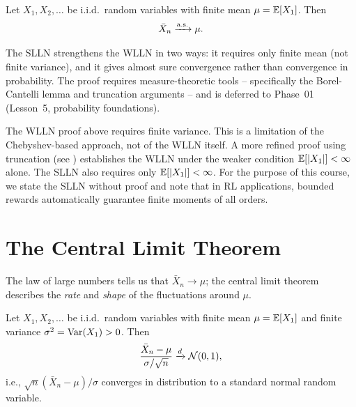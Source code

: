 \documentclass[11pt,a4paper]{article}
\begin{document}
\begin{theorem}
\label{thm:slln}
Let $X_1, X_2, \ldots$ be i.i.d.\ random variables with finite mean
$\mu = \mathbb{E}[X_1]$. Then
\[
    \bar{X}_n \xrightarrow{\text{a.s.}} \mu.
\]
\end{theorem}

The SLLN strengthens the WLLN in two ways: it requires only finite
mean (not finite variance), and it gives almost sure convergence
rather than convergence in probability. The proof requires
measure-theoretic tools -- specifically the Borel-Cantelli lemma and
truncation arguments -- and is deferred to Phase~01
(Lesson~5, probability foundations).

\begin{warning}[title={WLLN vs.\ SLLN: Finite Variance is Not
    Always Needed}]
The WLLN proof above requires finite variance. This is a
limitation of the Chebyshev-based approach, not of the WLLN itself.
A more refined proof using truncation (see \citet[Section 2.2]{durrett2019})
establishes the WLLN under the weaker condition $\mathbb{E}[|X_1|] < \infty$
alone. The SLLN also requires only $\mathbb{E}[|X_1|] < \infty$.
For the purpose of this course, we state the SLLN without proof
and note that in RL applications, bounded rewards automatically
guarantee finite moments of all orders.
\end{warning}


\section{The Central Limit Theorem}
\label{sec:clt}

The law of large numbers tells us that $\bar{X}_n \to \mu$; the
central limit theorem describes the \emph{rate} and \emph{shape} of
the fluctuations around $\mu$.

\begin{theorem}
\label{thm:clt}
Let $X_1, X_2, \ldots$ be i.i.d.\ random variables with finite mean
$\mu = \mathbb{E}[X_1]$ and finite variance $\sigma^2 = \operatorname{Var}(X_1) > 0$. Then
\[
    \frac{\bar{X}_n - \mu}{\sigma / \sqrt{n}} \xrightarrow{d}
    \mathcal{N}(0, 1),
\]
i.e., $\sqrt{n}(\bar{X}_n - \mu)/\sigma$ converges in distribution
to a standard normal random variable.
\end{theorem}
\end{document}

